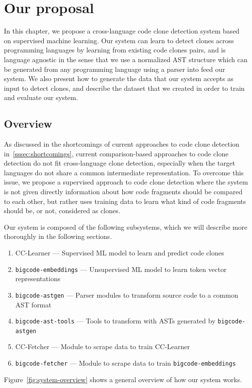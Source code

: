 \chapter{Our proposal}
In this chapter, we propose a cross-language code clone detection system based
on supervised machine learning. Our system can learn to detect clones across
programming languages by learning from existing code clones pairs, and is
language agnostic in the sense that we use a normalized AST structure which can
be generated from any programming language using a parser into feed our system.
We also present how to generate the data that our system accepts as input to
detect clones, and describe the dataset that we created in order to train and
evaluate our system.
%
\section{\label{sec:proposal-overview}Overview}
As discussed in the shortcomings of current approaches to code clone detection
in~\ref{sssec:shortcomings}, current comparison-based approaches to code clone
detection do not fit cross-language clone detection, especially when the target
languages do not share a common intermediate representation.
To overcome this issue, we propose a supervised approach to code clone detection
where the system is not given directly information about how code fragments
should be compared to each other, but rather uses training data to learn what
kind of code fragments should be, or not, considered as clones.

Our system is composed of the following subsystems, which we will describe more
thoroughly in the following sections.
\begin{enumerate}
\item\label{it:sup-model} CC-Learner --- Supervised ML model to learn and predict code clones
\item\label{it:unsup-model} \lstinline{bigcode-embeddings} --- Unsupervised ML
  model to learn token vector representations
\item\label{it:bigcode-astgen} \lstinline{bigcode-astgen} --- Parser modules to
  transform source code to a common AST format
\item\label{it:bigcode-ast-tools} \lstinline{bigcode-ast-tools} --- Tools to
  transform with ASTs generated by \lstinline{bigcode-astgen}
\item\label{it:sup-scraper} CC-Fetcher --- Module to scrape data to train CC-Learner
\item\label{it:unsup-scraper} \lstinline{bigcode-fetcher} --- Module to scrape data to train \lstinline{bigcode-embeddings}
\end{enumerate}
Figure~\ref{fig:system-overview} shows a general overview of how our system
works.

